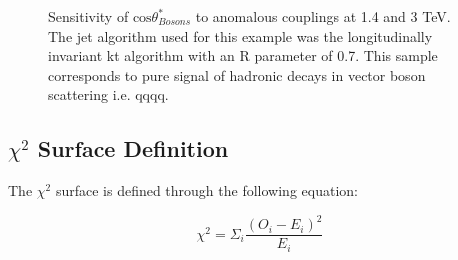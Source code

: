 \begin{figure}
\caption[Sensitivity of $\text{cos}\theta^{8}_{Bosons}$ to the anomalous gauge couplings $\alpha_{4}$ and $\alpha_{5}$ at 1.4 and 3 TeV.]{Sensitivity of $\text{cos}\theta^{*}_{Bosons}$ to anomalous couplings at 1.4 and 3 TeV. The jet algorithm used for this example was the longitudinally invariant kt algorithm with an R parameter of 0.7. This sample corresponds to pure signal of hadronic decays in vector boson scattering i.e. \nu{\nu}qqqq.}
\label{fig:costhetastarbosons}
\end{figure}


\subsection{$\chi^{2}$ Surface Definition}
\label{sec:chi2surfacedefinition}
The $\chi^{2}$ surface is defined through the following equation:

\begin{equation}
\chi^{2} = \Sigma_{i} \frac{(O_{i} - E_{i})^{2}}{E_{i}}
\end{equation}

